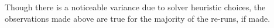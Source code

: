 Though there is a noticeable variance due to solver heuristic choices, the observations made above are true for the majority of the re-runs, if made. 



